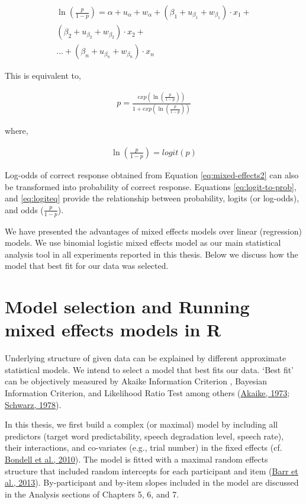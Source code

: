 \documentclass[a4paper, nobind]{templates/ociamthesis}
\begin{document}
\begin{align} \label{eq:mixed-effects2}
\ln (\frac{p}{1-p}) = \alpha + u_{\alpha} + w_{\alpha} +
                      (\beta_{1} + u_{\beta_{1}} + w_{\beta_{1}})\cdot {x_1} + \nonumber\\
                      (\beta_{2} + u_{\beta_{2}} + w_{\beta_{2}})\cdot {x_2} + \nonumber\\
                      ... + (\beta_{n} + u_{\beta_{n}} + w_{\beta_{n}})\cdot {x_n} 
\end{align}

This is equivalent to,

\begin{align} \label{eq:logit-to-prob}
p = {\frac{exp(\ln(\frac{p}{1-p}))}{1 + exp (\ln(\frac{p}{1-p}))}}
\end{align}

where,

\begin{align} \label{eq:logiteq}
\ln(\frac{p}{1-p}) =
{logit}(p)
\end{align}

Log-odds of correct response obtained from Equation \eqref{eq:mixed-effects2} can also be transformed into probability of correct response.
Equations \eqref{eq:logit-to-prob}, and \eqref{eq:logiteq} provide the relationship between probability, logits (or log-odds), and odds (\(\frac{p}{1-p}\)).

We have presented the advantages of mixed effects models over linear (regression) models.
We use binomial logistic mixed effects model as our main statistical analysis tool in all experiments reported in this thesis.
Below we discuss how the model that best fit for our data was selected.

\hypertarget{analysis-main}{%
\section{Model selection and Running mixed effects models in R}\label{analysis-main}}

Underlying structure of given data can be explained by different approximate statistical models.
We intend to select a model that best fits our data.
`Best fit' can be objectively measured by Akaike Information Criterion , Bayesian Information Criterion, and Likelihood Ratio Test among others (\protect\hyperlink{ref-Akaike1973}{Akaike, 1973}; \protect\hyperlink{ref-Schwarz1978}{Schwarz, 1978}).

In this thesis,
we first build a complex (or maximal) model by including all predictors (target word predictability, speech degradation level, speech rate),
their interactions, and co-variates (e.g., trial number) in the fixed effects (cf. \protect\hyperlink{ref-Bondell2010}{Bondell et al., 2010}).
The model is fitted with a maximal random effects structure that included random intercepts for each participant and item (\protect\hyperlink{ref-Barr2013}{Barr et al., 2013}).
By-participant and by-item slopes included in the model are discussed in the Analysis sections of Chapters 5, 6, and 7.
\end{document}
